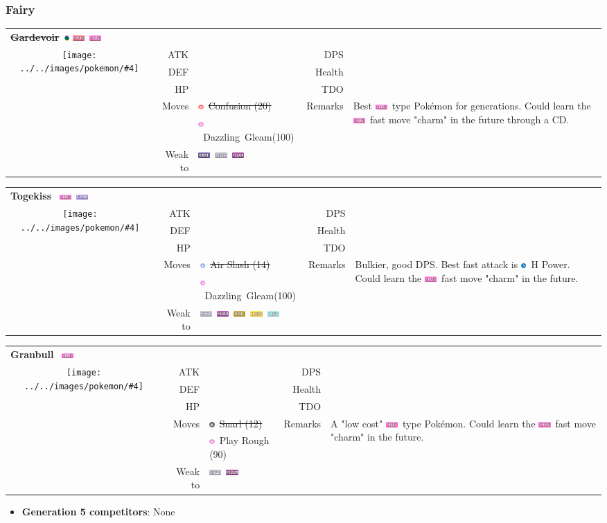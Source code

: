 \documentclass[12pt]{beamer}
\newcommand*{\colorbar}[2]{
\begin{tikzpicture}[line cap=round,line join=round,>=triangle 45,x=1.0cm,y=1.0cm]\clip(-0.15,-0.1) rectangle (2.5,0.1);
\draw [line width=8.pt,color=#1] (0.,0.)-- (#2/130,0.);
\draw[color=white] (0.2,0.) node {\scriptsize{$#2$}};
\end{tikzpicture}
}
\newcommand*{\attack}[1]{\colorbar{red}{#1}}
\newcommand*{\defense}[1]{\colorbar{lightblue}{#1}}
\newcommand*{\stamina}[1]{\colorbar{lightgreen}{#1}}
\newcommand*{\dps}[1]{
\begin{tikzpicture}[line cap=round,line join=round,>=triangle 45,x=1.0cm,y=1.0cm]\clip(-0.15,-0.1) rectangle (2.5,0.1);
\draw [line width=8.pt,color=black] (0.,0.)-- (#1/8.7,0.);
\draw[color=white] (0.3,0.) node {\scriptsize{$#1$}};
\end{tikzpicture}
}
\newcommand*{\survival}[1]{
\begin{tikzpicture}[line cap=round,line join=round,>=triangle 45,x=1.0cm,y=1.0cm]\clip(-0.15,-0.1) rectangle (2.5,0.1);
\draw [line width=8.pt,color=black] (0.,0.)-- (#1/18.,0.);
\draw[color=white] (0.3,0.) node {\scriptsize{$#1$}};
\end{tikzpicture}
}
\newcommand*{\tdo}[1]{
\begin{tikzpicture}[line cap=round,line join=round,>=triangle 45,x=1.0cm,y=1.0cm]\clip(-0.15,-0.1) rectangle (2.5,0.1);
\draw [line width=8.pt,color=black] (0.,0.)-- (#1/282.,0.);
\draw[color=white] (0.3,0.) node {\scriptsize{$#1$}};
\end{tikzpicture}
}
\newcommand{\electricfull}{\includegraphics[height=0.2cm]{../../images/type/full/Electric.png}}
\newcommand{\fairyfull}{\includegraphics[height=0.2cm]{../../images/type/full/Fairy.png}}
\newcommand{\flyingfull}{\includegraphics[height=0.2cm]{../../images/type/full/Flying.png}}
\newcommand{\ghostfull}{\includegraphics[height=0.2cm]{../../images/type/full/Ghost.png}}
\newcommand{\icefull}{\includegraphics[height=0.2cm]{../../images/type/full/Ice.png}}
\newcommand{\psychicfull}{\includegraphics[height=0.2cm]{../../images/type/full/Psychic.png}}
\newcommand{\rockfull}{\includegraphics[height=0.2cm]{../../images/type/full/Rock.png}}
\newcommand{\poisonfull}{\includegraphics[height=0.2cm]{../../images/type/full/Poison.png}}
\newcommand{\steelfull}{\includegraphics[height=0.2cm]{../../images/type/full/Steel.png}}
\newcommand{\dragonsimp}{\includegraphics[height=0.2cm]{../../images/type/simplified/dragon.png}}
\newcommand{\darksimp}{\includegraphics[height=0.2cm]{../../images/type/simplified/dark.png}}
\newcommand{\psysimp}{\includegraphics[height=0.2cm]{../../images/type/simplified/psy.png}}
\newcommand{\fairysimp}{\includegraphics[height=0.2cm]{../../images/type/simplified/fairy.png}}
\newcommand{\flyingsimp}{\includegraphics[height=0.2cm]{../../images/type/simplified/flying.png}}
\newcommand{\megaevol}{\includegraphics[width=0.2cm]{../../images/megaevolve}}
\newcommand*{\pokemon}[6]{
\begin{tabular}{p{3cm}rp{3cm}rp{4cm}} 
\textbf{#1}~#2 \hfill  #3 \\
\multicolumn{1}{c}{\multirow{6}{*}{\texttt{[image: ../../images/pokemon/\#4]}}} 
\pokemonstats#5
\pokemoncontinued#6
\end{tabular}
\medskip
}
\newcommand*{\pokemonstats}[6]{
& ATK  & \attack{#1}     &     DPS & \dps{#4} \\ 
& DEF & \defense{#2}  &  Health & \survival{#5} \\
& HP   & \stamina{#3}  &     TDO & \tdo{#6} \\ 
}
\newcommand{\pokemoncontinued}[4]{
& Moves & #1                 & Remarks & \multirow{3}{3.5cm}{#4} \\
&  		   & #2 & \\
&Weak to    & #3 &   \\
}
\begin{document}


\begin{frame}[label=Fairy]
\begin{footnotesize}
\frametitle{Fairy}

\begin{block}{}
\begin{center}

\pokemon{\sout{Gardevoir}}{\megaevol}{\psychicfull~\fairyfull}{Gardevoir.png}{{237}{196}{169}{15.09}{26.81}{404.5}}{{\psysimp~\sout{Confusion (20)}}{\fairysimp~Dazzling~Gleam(100)}{\ghostfull~\steelfull~\poisonfull}{Best \fairyfull~type Pokémon for generations. Could learn the \fairyfull~fast move "charm" in the future through a CD.}}
\bigskip
\bigskip

\pokemon{Togekiss}{}{\fairyfull~\flyingfull}{Togekiss.png}{{225}{217}{198}{13.86}{34.30}{475.5}}{{\flyingsimp~\sout{Air Slash (14)}}{\fairysimp~Dazzling~Gleam(100)}{\steelfull~\poisonfull~\rockfull~\electricfull~\icefull}{Bulkier, good DPS. Best fast attack is \dragonsimp~H Power. Could learn the \fairyfull~fast move "charm" in the future.}}
\bigskip
\bigskip

\pokemon{Granbull}{}{\fairyfull}{Granbull.png}{{212}{131}{207}{13.48}{22.49}{303.2}}{{\darksimp~\sout{Snarl (12)}}{\fairysimp~Play Rough (90)}{\steelfull~\poisonfull}{A "low cost" \fairyfull~type Pok\'emon. Could learn the \fairyfull~fast move "charm" in the future.}}
\bigskip
\bigskip

\begin{itemize}
  \item \textbf{Generation 5 competitors}: None
\end{itemize}
\end{center}
\end{block}


\end{footnotesize}
\end{frame}
\end{document}
